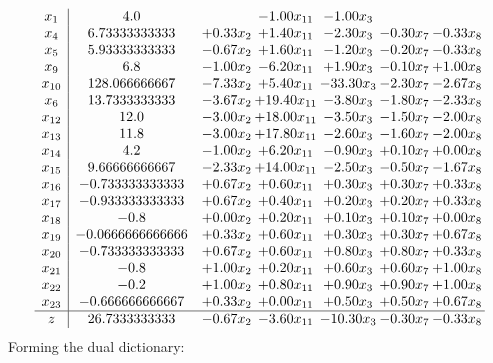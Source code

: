 \documentclass[8pt]{article}
\begin{document}
\[\begin{array}{c| c c@{\hskip 2pt} c@{\hskip 2pt} c@{\hskip 2pt} c@{\hskip 2pt} c@{\hskip 2pt} }
 x_{1}   &  4.0  &   & -1.00 x_{11} & -1.00 x_{3} &    &   \\
 x_{4}   &  6.73333333333 & +  0.33 x_{2} & +  1.40 x_{11} & -2.30 x_{3} & -0.30 x_{7} & -0.33 x_{8}\\
 x_{5}   &  5.93333333333 & -0.67 x_{2} & +  1.60 x_{11} & -1.20 x_{3} & -0.20 x_{7} & -0.33 x_{8}\\
 x_{9}   &  6.8 & -1.00 x_{2} & -6.20 x_{11} & +  1.90 x_{3} & -0.10 x_{7} & +  1.00 x_{8}\\
 x_{10}   &  128.066666667 & -7.33 x_{2} & +  5.40 x_{11} & -33.30 x_{3} & -2.30 x_{7} & -2.67 x_{8}\\
 x_{6}   &  13.7333333333 & -3.67 x_{2} & + 19.40 x_{11} & -3.80 x_{3} & -1.80 x_{7} & -2.33 x_{8}\\
 x_{12}   &  12.0 & -3.00 x_{2} & + 18.00 x_{11} & -3.50 x_{3} & -1.50 x_{7} & -2.00 x_{8}\\
 x_{13}   &  11.8 & -3.00 x_{2} & + 17.80 x_{11} & -2.60 x_{3} & -1.60 x_{7} & -2.00 x_{8}\\
 x_{14}   &  4.2 & -1.00 x_{2} & +  6.20 x_{11} & -0.90 x_{3} & +  0.10 x_{7} & +  0.00 x_{8}\\
 x_{15}   &  9.66666666667 & -2.33 x_{2} & + 14.00 x_{11} & -2.50 x_{3} & -0.50 x_{7} & -1.67 x_{8}\\
 x_{16}   &  -0.733333333333 & +  0.67 x_{2} & +  0.60 x_{11} & +  0.30 x_{3} & +  0.30 x_{7} & +  0.33 x_{8}\\
 x_{17}   &  -0.933333333333 & +  0.67 x_{2} & +  0.40 x_{11} & +  0.20 x_{3} & +  0.20 x_{7} & +  0.33 x_{8}\\
 x_{18}   &  -0.8 & +  0.00 x_{2} & +  0.20 x_{11} & +  0.10 x_{3} & +  0.10 x_{7} & +  0.00 x_{8}\\
 x_{19}   &  -0.0666666666666 & +  0.33 x_{2} & +  0.60 x_{11} & +  0.30 x_{3} & +  0.30 x_{7} & +  0.67 x_{8}\\
 x_{20}   &  -0.733333333333 & +  0.67 x_{2} & +  0.60 x_{11} & +  0.80 x_{3} & +  0.80 x_{7} & +  0.33 x_{8}\\
 x_{21}   &  -0.8 & +  1.00 x_{2} & +  0.20 x_{11} & +  0.60 x_{3} & +  0.60 x_{7} & +  1.00 x_{8}\\
 x_{22}   &  -0.2 & +  1.00 x_{2} & +  0.80 x_{11} & +  0.90 x_{3} & +  0.90 x_{7} & +  1.00 x_{8}\\
 x_{23}   &  -0.666666666667 & +  0.33 x_{2} & +  0.00 x_{11} & +  0.50 x_{3} & +  0.50 x_{7} & +  0.67 x_{8}\\
\hline
z    &  26.7333333333 & -0.67 x_{2} & -3.60 x_{11} & -10.30 x_{3} & -0.30 x_{7} & -0.33 x_{8}\\
\end{array}\]
Forming the dual dictionary:
\end{document}
